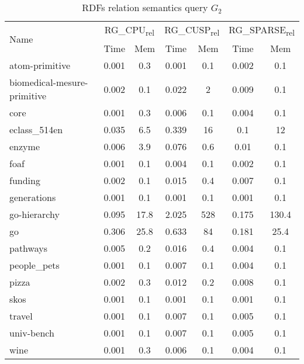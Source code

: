 {\setlength{\tabcolsep}{0.4em}
\begin{table*}[h]
\caption{RDFs relation semantics query $G_2$}
\label{tbl:tableRDFRelationalPathIndexQ2}
\begin{tabular}{| l | c  c | c  c | c  c |}
    \hline
    \multirow{2}{*}{Name}	&	\multicolumn{2}{|c|}{RG\_CPU\textsubscript{rel}}	&	\multicolumn{2}{|c|}{RG\_CUSP\textsubscript{rel}}	&	\multicolumn{2}{|c|}{RG\_SPARSE\textsubscript{rel}}	 \\
    		& Time & Mem &  Time     & Mem & Time     & Mem  \\    
    \hline
    \hline
    atom-primitive          & 0.001 & 0.3  & 0.001 & 0.1 & 0.002 & 0.1   \\
biomedical-mesure-primitive & 0.002 & 0.1  & 0.022 & 2   & 0.009 & 0.1   \\
core                        & 0.001 & 0.3  & 0.006 & 0.1 & 0.004 & 0.1   \\
eclass\_514en               & 0.035 & 6.5  & 0.339 & 16  & 0.1   & 12    \\
enzyme                      & 0.006 & 3.9  & 0.076 & 0.6 & 0.01  & 0.1   \\
foaf                        & 0.001 & 0.1  & 0.004 & 0.1 & 0.002 & 0.1   \\
funding                     & 0.002 & 0.1  & 0.015 & 0.4 & 0.007 & 0.1   \\
generations                 & 0.001 & 0.1  & 0.001 & 0.1 & 0.001 & 0.1   \\
go-hierarchy                & 0.095 & 17.8 & 2.025 & 528 & 0.175 & 130.4 \\
go                          & 0.306 & 25.8 & 0.633 & 84  & 0.181 & 25.4  \\
pathways                    & 0.005 & 0.2  & 0.016 & 0.4 & 0.004 & 0.1   \\
people\_pets                & 0.001 & 0.1  & 0.007 & 0.1 & 0.004 & 0.1   \\
pizza                       & 0.002 & 0.3  & 0.012 & 0.2 & 0.008 & 0.1   \\
skos                        & 0.001 & 0.1  & 0.001 & 0.1 & 0.001 & 0.1   \\
travel                      & 0.001 & 0.1  & 0.007 & 0.1 & 0.005 & 0.1   \\
univ-bench                  & 0.001 & 0.1  & 0.007 & 0.1 & 0.005 & 0.1   \\
wine                        & 0.001 & 0.3  & 0.006 & 0.1 & 0.004 & 0.1  \\
    \hline
  \end{tabular}
\end{table*}
}

